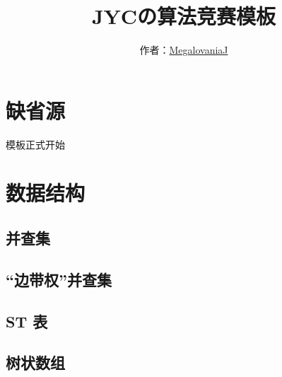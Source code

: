 \documentclass[12pt]{article}
\begin{document}
\title{\vspace{-2cm}\textbf{\huge{JYCの算法竞赛模板}}}
\author{作者：\href{https://codeforces.com/profile/MegalovaniaJ}{MegalovaniaJ}}
\date{}
\maketitle

\tableofcontents

\newpage

{\centering\section{缺省源}}

模板正式开始



\newpage

{\centering\section{数据结构}}

\subsection{并查集}



\newpage

\subsection{“边带权”并查集}



\newpage

\subsection{ST 表}



\newpage

\subsection{树状数组}


\end{document}
